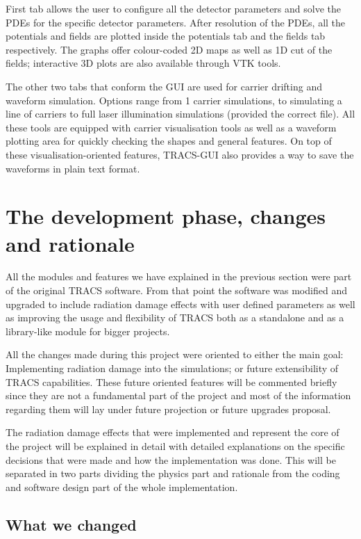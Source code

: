First tab allows the user to configure all the detector parameters and solve the PDEs for the specific detector parameters. After resolution of the PDEs, all the potentials and fields are plotted inside the potentials tab and the fields tab respectively. The graphs offer colour-coded 2D maps as well as 1D cut of the fields; interactive 3D plots are also available through VTK tools.

The other two tabs that conform the GUI are used for carrier drifting and waveform simulation. Options range from 1 carrier simulations, to simulating a line of carriers to full laser illumination simulations (provided the correct file). All these tools are equipped with carrier visualisation tools as well as a waveform plotting area for quickly checking the shapes and general features. On top of these visualisation-oriented features, TRACS-GUI also provides a way to save the waveforms in plain text format.

\section{The development phase, changes and rationale} %
\label{sec:werk}

All the modules and features we have explained in the previous section were part of the original TRACS software. From that point the software was modified and upgraded to include radiation damage effects  with user defined parameters as well as improving the usage and flexibility of TRACS both as a standalone and as a library-like module for bigger projects.

All the changes made during this project were oriented to either the main goal: Implementing radiation damage into the simulations; or future extensibility of TRACS capabilities. These future oriented features will be commented briefly since they are not a fundamental part of the project and most of the information regarding them will lay under future projection or future upgrades proposal.

The radiation damage effects that were implemented and represent the core of the project will be explained in detail with detailed explanations on the specific decisions that were made and how the implementation was done. This will be separated in two parts dividing the physics part and rationale from the coding and software design part of the whole implementation.

\subsection{What we changed}

